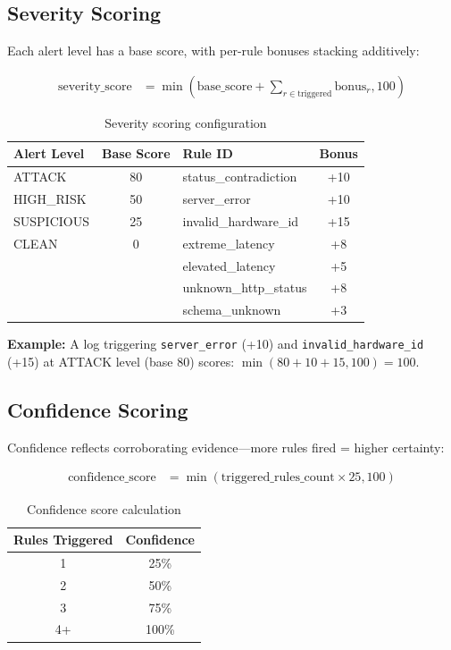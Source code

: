 \documentclass[12pt,a4paper]{article}
\begin{document}
\subsection{Severity Scoring}

Each alert level has a base score, with per-rule bonuses stacking additively:

\begin{align}
\text{severity\_score} &= \min(\text{base\_score} + \sum_{r \in \text{triggered}} \text{bonus}_r, 100)
\end{align}

\begin{table}[H]
\centering
\begin{tabular}{l c | l c}
\toprule
\textbf{Alert Level} & \textbf{Base Score} & \textbf{Rule ID} & \textbf{Bonus} \\
\midrule
ATTACK & 80 & status\_contradiction & +10 \\
HIGH\_RISK & 50 & server\_error & +10 \\
SUSPICIOUS & 25 & invalid\_hardware\_id & +15 \\
CLEAN & 0 & extreme\_latency & +8 \\
 &  & elevated\_latency & +5 \\
 &  & unknown\_http\_status & +8 \\
 &  & schema\_unknown & +3 \\
\bottomrule
\end{tabular}
\caption{Severity scoring configuration}
\end{table}

\textbf{Example:} A log triggering \texttt{server\_error} (+10) and \texttt{invalid\_hardware\_id} (+15) at ATTACK level (base 80) scores: $\min(80 + 10 + 15, 100) = 100$.

\subsection{Confidence Scoring}

Confidence reflects corroborating evidence---more rules fired = higher certainty:

\begin{align}
\text{confidence\_score} &= \min(\text{triggered\_rules\_count} \times 25, 100)
\end{align}

\begin{table}[H]
\centering
\begin{tabular}{c c}
\toprule
\textbf{Rules Triggered} & \textbf{Confidence} \\
\midrule
1 & 25\% \\
2 & 50\% \\
3 & 75\% \\
4+ & 100\% \\
\bottomrule
\end{tabular}
\caption{Confidence score calculation}
\end{table}
\end{document}
